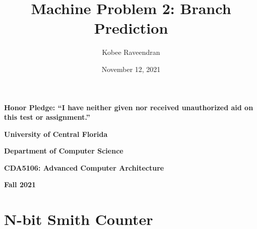 \documentclass{article}
\title{Machine Problem 2: Branch Prediction}
\author{Kobee Raveendran}
\date{November 12, 2021}
\begin{document}
    \begin{titlepage}
        
        \maketitle
        \null  %
        \nointerlineskip  %
        \vfill
        \let\snewpage \newpage
        \let\newpage \relax
        \centering
        {\large \textbf{Honor Pledge: ``I have neither given nor received unauthorized aid on this test or assignment.''}}
        

        \vspace{6cm}
        {\large \textbf{University of Central Florida}}
        
        \vspace{1cm}

        {\large \textbf{Department of Computer Science}}

        \vspace{1cm}

        {\large \textbf{CDA5106: Advanced Computer Architecture}}

        \vspace{1cm}

        {\large \textbf{Fall 2021}}
        \let \newpage \snewpage
        \vfill 
        \break %

    \end{titlepage}

    \section{N-bit Smith Counter}
\end{document}
